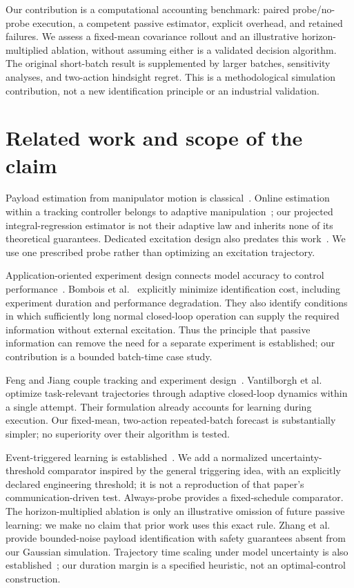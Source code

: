 \documentclass[10pt,twocolumn]{article}
\begin{document}
Our contribution is a computational accounting benchmark: paired probe/no-probe execution, a competent passive estimator, explicit overhead, and retained failures. We assess a fixed-mean covariance rollout and an illustrative horizon-multiplied ablation, without assuming either is a validated decision algorithm. The original short-batch result is supplemented by larger batches, sensitivity analyses, and two-action hindsight regret. This is a methodological simulation contribution, not a new identification principle or an industrial validation.

\section{Related work and scope of the claim}
Payload estimation from manipulator motion is classical~\cite{atkeson1986}. Online estimation within a tracking controller belongs to adaptive manipulation~\cite{slotine1987}; our projected integral-regression estimator is not their adaptive law and inherits none of its theoretical guarantees. Dedicated excitation design also predates this work~\cite{swevers1997}. We use one prescribed probe rather than optimizing an excitation trajectory.

Application-oriented experiment design connects model accuracy to control performance~\cite{hjalmarsson2005}. Bombois et al.~\cite{bombois2006} explicitly minimize identification cost, including experiment duration and performance degradation. They also identify conditions in which sufficiently long normal closed-loop operation can supply the required information without external excitation. Thus the principle that passive information can remove the need for a separate experiment is established; our contribution is a bounded batch-time case study.

Feng and Jiang couple tracking and experiment design~\cite{feng2020}. Vantilborgh et al.~\cite{vantilborgh2026} optimize task-relevant trajectories through adaptive closed-loop dynamics within a single attempt. Their formulation already accounts for learning during execution. Our fixed-mean, two-action repeated-batch forecast is substantially simpler; no superiority over their algorithm is tested.

Event-triggered learning is established~\cite{solowjow2020}. We add a normalized uncertainty-threshold comparator inspired by the general triggering idea, with an explicitly declared engineering threshold; it is not a reproduction of that paper's communication-driven test. Always-probe provides a fixed-schedule comparator. The horizon-multiplied ablation is only an illustrative omission of future passive learning: we make no claim that prior work uses this exact rule. Zhang et al.~\cite{zhang2025} provide bounded-noise payload identification with safety guarantees absent from our Gaussian simulation. Trajectory time scaling under model uncertainty is also established~\cite{moreno2006}; our duration margin is a specified heuristic, not an optimal-control construction.
\end{document}
